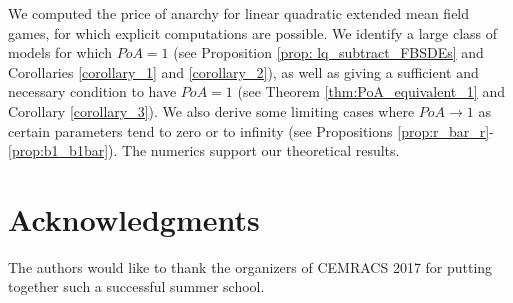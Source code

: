\documentclass[11pt]{article}
\begin{document}
We computed the price of anarchy for linear quadratic extended mean field games, for which explicit computations are possible. We identify a large class of models for which $PoA=1$ (see Proposition \ref{prop: lq_subtract_FBSDEs} and Corollaries \ref{corollary_1} and \ref{corollary_2}), as well as giving a sufficient and necessary condition to have $PoA=1$ (see Theorem \ref{thm:PoA_equivalent_1} and Corollary \ref{corollary_3}). We also derive some limiting cases where $PoA \rightarrow 1$ as certain parameters tend to zero or to infinity (see Propositions \ref{prop:r_bar_r}-\ref{prop:b1_b1bar}). The numerics support our theoretical results.

\section{\textbf{Acknowledgments}}
The authors would like to thank the organizers of CEMRACS 2017 for putting together such a successful summer school.
\end{document}
